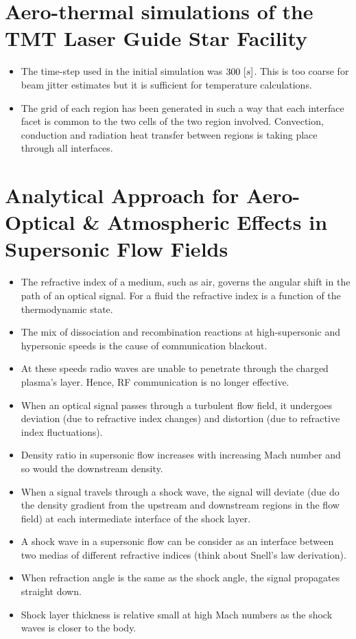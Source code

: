 	\section{Aero-thermal simulations of the TMT Laser Guide Star Facility \cite{10.1117/12.2057208}} 
        \begin{itemize}
            \item The time-step used in the initial simulation was $300\,\left[s\right]$. This is too coarse for beam jitter estimates but it is sufficient for temperature calculations.
            \item The grid of each region has been generated in such a way that each interface facet is common to the two cells of the two region involved. Convection, conduction and radiation heat transfer between regions is taking place through all interfaces.
        \end{itemize}
		

    \section{Analytical Approach for Aero-Optical \& Atmospheric Effects in Supersonic Flow Fields \cite{doi:10.2514/6.2020-0684}} 
        \begin{itemize}
            \item The refractive index of a medium, such as air, governs the angular shift in the path of an optical signal. For a fluid the refractive index is a function of the thermodynamic state. 
            \item The mix of dissociation and recombination reactions at high-supersonic and hypersonic speeds is the cause of communication blackout.
            \item At these speeds radio waves are unable to penetrate through the charged plasma's layer. Hence, RF communication is no longer effective.
            \item When an optical signal passes through a turbulent flow field, it undergoes deviation (due to refractive index changes) and distortion (due to refractive index fluctuations).
            \item Density ratio in supersonic flow increases with increasing Mach number and so would the downstream density. 
            \item When a signal travels through a shock wave, the signal will deviate (due do the density gradient from the upstream and downstream regions in the flow field) at each intermediate interface of the shock layer.  
            \item A shock wave in a supersonic flow can be consider as an interface between two medias of different refractive indices (think about Snell's law derivation). 
            \item When refraction angle is the same as the shock angle, the signal propagates straight down. 
            \item Shock layer thickness is relative small at high Mach numbers as the shock waves is closer to the body. 
        \end{itemize}
		

